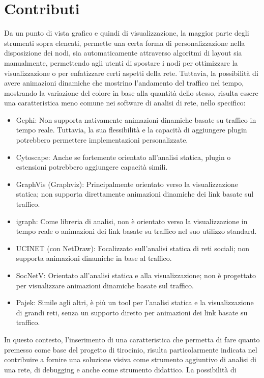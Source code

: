 \documentclass[binding=0.6cm]{sapthesis}
\begin{document}
\section{Contributi}
Da un punto di vista grafico e quindi di visualizzazione, la maggior parte degli strumenti sopra elencati, permette una certa forma di personalizzazione nella disposizione dei nodi, sia automaticamente attraverso algoritmi di layout sia manualmente, 
permettendo agli utenti di spostare i nodi per ottimizzare la visualizzazione o per enfatizzare certi aspetti della rete. Tuttavia, la possibilità di
avere animazioni dinamiche che mostrino l'andamento del traffico nel tempo, mostrando la variazione del colore in base alla quantità dello stesso, risulta
essere una caratteristica meno comune nei software di analisi di rete, nello specifico:
\begin{itemize}	
  \item Gephi: Non supporta nativamente animazioni dinamiche basate su traffico in tempo reale. Tuttavia, la sua flessibilità e la capacità di aggiungere plugin potrebbero permettere implementazioni personalizzate.
  \item Cytoscape: Anche se fortemente orientato all'analisi statica, plugin o estensioni potrebbero aggiungere capacità simili.
  \item GraphVis (Graphviz): Principalmente orientato verso la visualizzazione statica; non supporta direttamente animazioni dinamiche dei link basate sul traffico.
  \item igraph: Come libreria di analisi, non è orientato verso la visualizzazione in tempo reale o animazioni dei link basate su traffico nel suo utilizzo standard.
  \item UCINET (con NetDraw): Focalizzato sull'analisi statica di reti sociali; non supporta animazioni dinamiche in base al traffico.
  \item SocNetV: Orientato all'analisi statica e alla visualizzazione; non è progettato per visualizzare animazioni dinamiche basate sul traffico.
  \item Pajek: Simile agli altri, è più un tool per l'analisi statica e la visualizzazione di grandi reti, senza un supporto diretto per animazioni dei link basate su traffico.
\end{itemize}
In questo contesto, l'inserimento di una caratteristica che permetta di fare quanto premesso come base
del progetto di tirocinio, risulta particolarmente indicata nel contribuire a fornire una soluzione visiva come
strumento aggiuntivo di analisi di una rete, di debugging e anche come strumento didattico. La possibilità di
\end{document}
